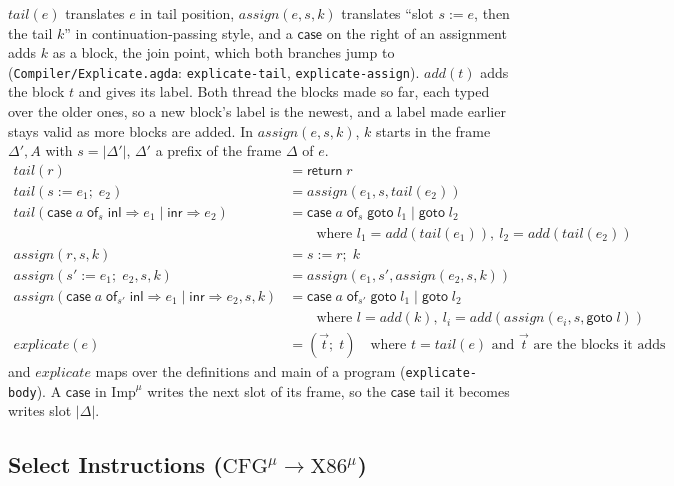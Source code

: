 \documentclass[10pt]{article}
\theoremstyle{acmplain}
\newcommand{\key}[1]{\mathsf{#1}}
\newcommand{\pass}[1]{\mathit{#1}}
\newcommand{\assign}[3]{#1 \mathrel{:=} #2;\; #3}
\newcommand{\Casei}[4]{\key{case}\;#1\;\key{of}_{#2}\;\key{inl} \Rightarrow #3 \mid \key{inr} \Rightarrow #4}
\newcommand{\Treturn}[1]{\key{return}\;#1}
\newcommand{\Tgoto}[1]{\key{goto}\;#1}
\newcommand{\Tcase}[4]{\key{case}\;#1\;\key{of}_{#2}\;\key{goto}\;#3 \mid \key{goto}\;#4}
\newcommand{\Ml}[1]{\textrm{#1}^{\mu}}                  %
\begin{document}
$\pass{tail}(e)$ translates $e$ in tail position, $\pass{assign}(e, s, k)$
translates ``slot $s := e$, then the tail $k$'' in continuation-passing
style, and a $\key{case}$ on the right of an assignment adds $k$ as a
block, the join point, which both branches jump to
(\texttt{Compiler/Explicate.agda}: \texttt{explicate-tail},
\texttt{explicate-assign}). $\pass{add}(t)$ adds the block $t$ and gives
its label. Both thread the blocks made so far, each typed over the older
ones, so a new block's label is the newest, and a label made earlier stays
valid as more blocks are added. In $\pass{assign}(e, s, k)$, $k$ starts in
the frame $\Delta', A$ with $s = |\Delta'|$, $\Delta'$ a prefix of the
frame $\Delta$ of $e$.
\begin{align*}
  \pass{tail}(r) &= \Treturn{r} \\
  \pass{tail}(\assign{s}{e_1}{e_2}) &= \pass{assign}(e_1, s, \pass{tail}(e_2)) \\
  \pass{tail}(\Casei{a}{s}{e_1}{e_2}) &= \Tcase{a}{s}{l_1}{l_2} \\
  &\qquad \text{where } l_1 = \pass{add}(\pass{tail}(e_1)),\ l_2 = \pass{add}(\pass{tail}(e_2)) \\[1ex]
  \pass{assign}(r, s, k) &= \assign{s}{r}{k} \\
  \pass{assign}(\assign{s'}{e_1}{e_2}, s, k) &= \pass{assign}(e_1, s', \pass{assign}(e_2, s, k)) \\
  \pass{assign}(\Casei{a}{s'}{e_1}{e_2}, s, k) &= \Tcase{a}{s'}{l_1}{l_2} \\
  &\qquad \text{where } l = \pass{add}(k),\
    l_i = \pass{add}(\pass{assign}(e_i, s, \Tgoto{l})) \\[1ex]
  \pass{explicate}(e) &= (\vec{t};\; t)
    \quad\text{where } t = \pass{tail}(e) \text{ and } \vec{t} \text{ are the blocks it adds}
\end{align*}
and $\pass{explicate}$ maps over the definitions and main of a program
(\texttt{explicate-body}). A $\key{case}$ in $\Ml{Imp}$ writes the next slot
of its frame, so the $\key{case}$ tail it becomes writes slot $|\Delta|$.

\subsection{Select Instructions (\texorpdfstring{$\Ml{CFG} \to \Ml{X86}$}{CFG-mu -> X86-mu})}\label{sec:m-select}
\end{document}
